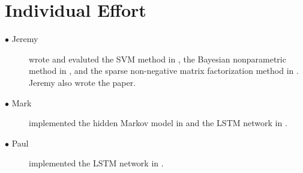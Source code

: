 \documentclass[5p]{elsarticle}
\begin{document}
\section{Individual Effort}
\begin{description}
\item[$\bullet$ Jeremy] wrote and evaluted the SVM method in \citet{poliner2006discriminative}, the Bayesian nonparametric method in \citet{blei2010bayesian}, and the sparse non-negative matrix factorization method in \citet{abdallah2004polyphonic}. Jeremy also wrote the paper.
\item[$\bullet$ Mark] implemented the hidden Markov model in \citet{poliner2006discriminative} and the LSTM network in \citet{bock2012polyphonic}.
\item[$\bullet$ Paul] implemented the LSTM network in \citet{bock2012polyphonic}.
\end{description}















%
%
%
%
%
%
%

\end{document}
